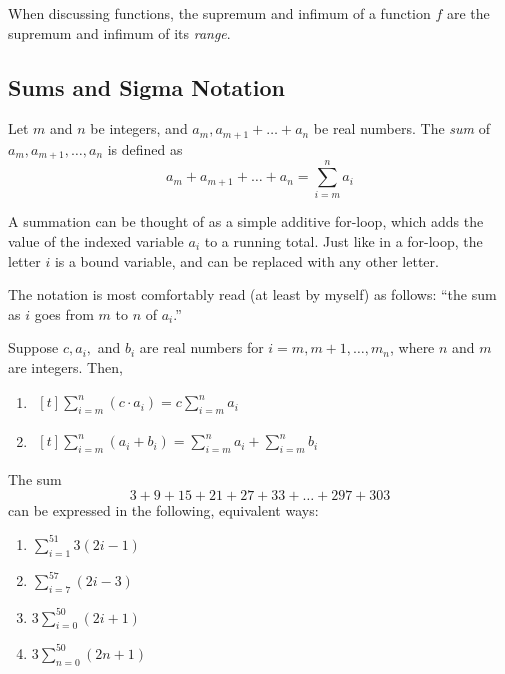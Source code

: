 \documentclass{article}
\begin{document}
      When discussing functions, the supremum and infimum of a function \(f\) are the supremum and infimum of its \emph{range}.

      \subsection{Sums and Sigma Notation}
      \begin{defi}
        Let \(m\) and \(n\) be integers, and \(a_m, a_{m+1} + \ldots + a_n\) be real numbers. The \emph{sum} of \(a_m, a_{m+1}, \ldots, a_n\) is defined as 
        \[
          a_m + a_{m+1} + \ldots + a_n = \sum_{i = m}^{n}{a_i}
        \]

      \end{defi}

      A summation can be thought of as a simple additive for-loop, which adds the value of the indexed variable \(a_i\) to a running total. Just like in a for-loop, the letter \(i\) is a bound variable, and can be replaced with any other letter.
      
      The notation is most comfortably read (at least by myself) as follows: ``the sum as \(i\) goes from \(m\) to \(n\) of \(a_i\).''

      \begin{prop}
        Suppose \(c, a_i,\) and \(b_i\) are real numbers for \(i = m, m+1, \ldots, m_n\), where \(n\) and \(m\) are integers. Then,
        \begin{enumerate}
          \item \(\begin{aligned}[t]
                    \sum_{i = m}^{n}{(c \cdot a_i)} = c \sum_{i = m}^{n}{a_i}
                 \end{aligned}\)
          \item \(\begin{aligned}[t]
                    \sum_{i = m}^{n}{(a_i + b_i)} = \sum_{i = m}^{n}{a_i} + \sum_{i = m}^{n}{b_i}
                  \end{aligned}\)
      \end{enumerate}
      \end{prop}

      \begin{eg}
        The sum 
        \[
          3 + 9 + 15 + 21 + 27 + 33 + \ldots  + 297 + 303
        \]
        can be expressed in the following, equivalent ways:

        \begin{enumerate}
          \item \(\sum_{i = 1}^{51}{3(2i - 1)}\)
          \item \(\sum_{i = 7}^{57}{(2i - 3)}\)
          \item \(3\sum_{i = 0}^{50}{(2i+1)}\)
          \item \(3\sum_{n = 0}^{50}{(2n+1)}\)
        \end{enumerate}
      \end{eg}
\end{document}

